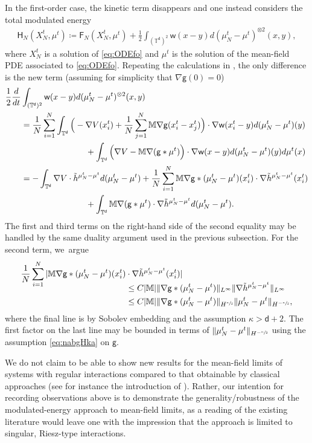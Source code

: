 \documentclass[10pt]{amsart}
\theoremstyle{plain}
\theoremstyle{definition}
\newcommand{\M}{{\mathbb{M}}}
\newcommand{\T}{{\mathbb{T}}}
\let\ka\kappa
\let\nab\nabla
\let\tl\tilde
\newcommand{\XN}{X_N}
\newcommand{\Fr}{\mathsf{F}}
\renewcommand{\d}{\mathsf{d}}
\newcommand{\g}{{\mathsf{g}}}
\newcommand{\w}{\mathsf{w}}
\begin{document}
In the first-order case, the kinetic term disappears and one instead considers the total modulated energy
\begin{align*}
\mathsf{H}_N(X_N^t,\mu^t) \coloneqq \Fr_N(\XN^t,\mu^t) + \frac12\int_{(\T^\d)^2}\w(x-y)d(\mu_N^t-\mu^t)^{\otimes 2}(x,y),
\end{align*}
where $X_N^t$ is a solution of \eqref{eq:ODEfo} and $\mu^t$ is the solution of the mean-field PDE associated to \eqref{eq:ODEfo}. Repeating the calculations in \cite{Serfaty2020}, the only difference is the new term (assuming for simplicity that $\nab\g(0)=0$)
\begin{align*}
\frac12\frac{d}{dt}&\int_{(\T^\d)^2}\w(x-y)d(\mu_N^t - \mu^t)^{\otimes 2}(x,y)\\
&=\frac1N\sum_{i=1}^N \int_{\T^\d}\Big(-\nab V(x_i^t) + \frac1N\sum_{j=1}^N\M\nab\g(x_i^t-x_j^t)\Big)\cdot \nab \w(x_i^t-y)d(\mu_N^t-\mu^t)(y)\\
&\hspace*{2.7cm}+ \int_{\T^\d}\Big(\nab V - \M\nab(\g\ast\mu^t)\Big)\cdot\nab\w(x-y)d(\mu_N^t-\mu^t)(y)d\mu^t(x)\\
&= -\int_{\T^\d}\nab V\cdot \tl{h}^{\mu_N^t-\mu^t}d(\mu_N^t-\mu^t) +\frac1N\sum_{i=1}^N \M\nab\g\ast(\mu_N^t-\mu^t)(x_i^t) \cdot \nab\tl{h}^{\mu_N^t-\mu^t}(x_i^t)\\
&\hspace*{2.7cm}+ \int_{\T^\d}\M\nab(\g\ast \mu^t)\cdot \nab\tl{h}^{\mu_N^t-\mu^t} d(\mu_N^t-\mu^t).
\end{align*}
The first and third terms on the right-hand side of the second equality may be handled by the same duality argument used in the previous subsection. For the second term, we~argue
\begin{align*}
\frac1N\sum_{i=1}^N |\M\nab\g\ast(\mu_N^t-\mu^t)(x_i^t) &\cdot \nab\tl{h}^{\mu_N^t-\mu^t}(x_i^t)|\\[-10pt]
&\le C|\M|\|\nab\g\ast(\mu_N^t-\mu^t)\|_{L^\infty}\|\nab\tl{h}^{\mu_N^t-\mu^t}\|_{L^\infty}\\
&\le C|\M| \|\nab\g\ast(\mu_N^t-\mu^t)\|_{H^{\sfrac\ka2}} \|\mu_N^t-\mu^t\|_{H^{-\sfrac{\ka}2}},
\end{align*}
where the final line is by Sobolev embedding and the assumption $\ka>\d+2$. The first factor on the last line may be bounded in terms of $\|\mu_N^t-\mu^t\|_{H^{-\sfrac\ka2}}$ using the assumption \eqref{eq:nabgHka} on $\g$.

{
We do not claim to be able to show new results for the mean-field limits of systems with regular interactions compared to that obtainable by classical approaches (see for instance the introduction of \cite{RS2022}). Rather, our intention for recording observations above is to demonstrate the generality/robustness of the modulated-energy approach to mean-field limits, as a reading of the existing literature would leave one with the impression that the approach is limited to singular, Riesz-type interactions.
}
\end{document}
